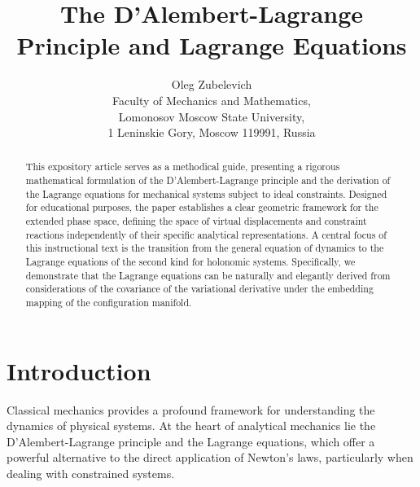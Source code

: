 \documentclass[reqno,12pt]{amsproc}
\begin{document}
\title
{The D'Alembert-Lagrange Principle and Lagrange Equations}
\author[Oleg Zubelevich]{Oleg Zubelevich\\Faculty of Mechanics and Mathematics,\\
Lomonosov Moscow State University,\\ 1 Leninskie Gory, Moscow 119991, Russia}

\date{}


\begin{abstract}This expository article serves as a methodical guide, presenting a rigorous mathematical formulation of the D'Alembert-Lagrange principle and the derivation of the Lagrange equations for mechanical systems subject to ideal constraints. Designed for educational purposes, the paper establishes a clear geometric framework for the extended phase space, defining the space of virtual displacements and constraint reactions independently of their specific analytical representations. A central focus of this instructional text is the transition from the general equation of dynamics to the Lagrange equations of the second kind for holonomic systems. Specifically, we demonstrate that the Lagrange equations can be naturally and elegantly derived from considerations of the covariance of the variational derivative under the embedding mapping of the configuration manifold.
\end{abstract}

\maketitle

\section{Introduction}

Classical mechanics provides a profound framework for understanding the dynamics of physical systems. At the heart of analytical mechanics lie the D'Alembert-Lagrange principle and the Lagrange equations, which offer a powerful alternative to the direct application of Newton's laws, particularly when dealing with constrained systems.
\end{document}
